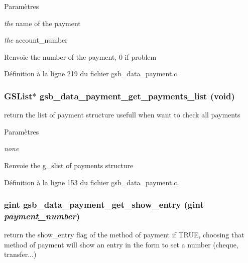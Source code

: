 \begin{DoxyParams}{Paramètres}
\item[{\em the}]name of the payment \item[{\em the}]account\_\-number\end{DoxyParams}
\begin{DoxyReturn}{Renvoie}
the number of the payment, 0 if problem 
\end{DoxyReturn}


Définition à la ligne 219 du fichier gsb\_\-data\_\-payment.c.

\subsubsection[{gsb\_\-data\_\-payment\_\-get\_\-payments\_\-list}]{\setlength{\rightskip}{0pt plus 5cm}GSList$\ast$ gsb\_\-data\_\-payment\_\-get\_\-payments\_\-list (void)}\label{gsb__data__payment_8c_acec454aa5a57af2dd716d6b38e97baec}
return the list of payment structure usefull when want to check all payments


\begin{DoxyParams}{Paramètres}
\item[{\em none}]\end{DoxyParams}
\begin{DoxyReturn}{Renvoie}
the g\_\-slist of payments structure 
\end{DoxyReturn}


Définition à la ligne 153 du fichier gsb\_\-data\_\-payment.c.

\subsubsection[{gsb\_\-data\_\-payment\_\-get\_\-show\_\-entry}]{\setlength{\rightskip}{0pt plus 5cm}gint gsb\_\-data\_\-payment\_\-get\_\-show\_\-entry (gint {\em payment\_\-number})}\label{gsb__data__payment_8c_a8255baec69955b14988acbff6f5bc3d9}
return the show\_\-entry flag of the method of payment if TRUE, choosing that method of payment will show an entry in the form to set a number (cheque, transfer...)


